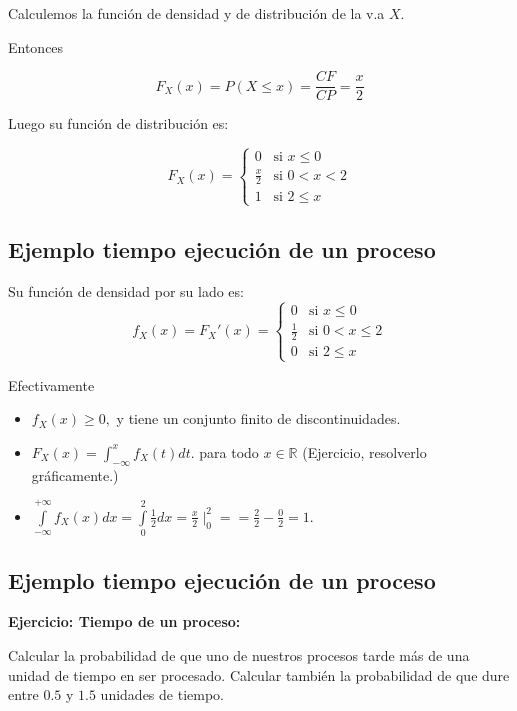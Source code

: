 \documentclass[]{book}
\providecommand{\tightlist}{%
  \setlength{\itemsep}{0pt}\setlength{\parskip}{0pt}}
\begin{document}
Calculemos la función de densidad y de distribución de la v.a \(X\).

Entonces

\[
F_{X}(x)=P(X\leq x)=\frac{CF}{CP}=\frac{x}2
\]

Luego su función de distribución es:

\[
F_{X}(x)=\left\{\begin{array}{ll}
0 & \mbox{si } x\leq 0\\
\frac{x}2 & \mbox{si } 0<x<2\\
1 & \mbox{si } 2\leq x
\end{array}\right.
\]

\hypertarget{ejemplo-tiempo-ejecuciuxf3n-de-un-proceso-1}{%
\subsection{Ejemplo tiempo ejecución de un proceso}\label{ejemplo-tiempo-ejecuciuxf3n-de-un-proceso-1}}

Su función de densidad por su lado es:
\[
f_{X}(x)=F_{X}'(x)=\left\{\begin{array}{ll}
0 & \mbox{si } x\leq 0\\
\frac12 & \mbox{si } 0<x\leq 2\\
0 & \mbox{si } 2\leq x
\end{array}\right.
\]

Efectivamente

\begin{itemize}
\tightlist
\item
  \(f_{X}(x)\geq 0,\) y tiene un conjunto finito de discontinuidades.
\item
  \(F_X(x)=\int_{-\infty}^x f_X(t) dt.\) para todo \(x\in \mathbb{R}\) (Ejercicio,
  resolverlo gráficamente.)
\item
  \(\int\limits_{-\infty}^{+\infty}f_{X}(x)dx= \int\limits_0^2\frac12dx=\frac{x}2\mid_0^2= =\frac22-\frac02=1.\)
\end{itemize}

\hypertarget{ejemplo-tiempo-ejecuciuxf3n-de-un-proceso-2}{%
\subsection{Ejemplo tiempo ejecución de un proceso}\label{ejemplo-tiempo-ejecuciuxf3n-de-un-proceso-2}}

\textbf{Ejercicio: Tiempo de un proceso:}

Calcular la probabilidad de que uno de nuestros procesos tarde
más de una unidad de tiempo en ser procesado. Calcular también la probabilidad de
que dure entre \(0.5\) y \(1.5\) unidades de tiempo.
\end{document}
